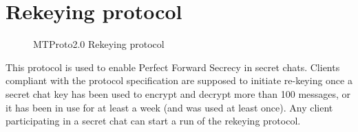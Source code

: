 \section{Rekeying protocol}
\label{sec:rekeying}

\begin{figure}[t]
\setlength{\instdist}{3.5cm}
\setmscoptions
\begin{msc}{}



\nextlevel[2]

\nextlevel[6]
\nextlevel
{}
\nextlevel


\nextlevel[6]
\nextlevel
{}
\nextlevel


\nextlevel[4]
\nextlevel
{}

\end{msc}

\centering
\caption{MTProto2.0 Rekeying protocol}
\label{fig:rekeying-protocol}
\end{figure}

This protocol is used to enable Perfect Forward Secrecy in secret chats. Clients compliant with the protocol specification are supposed to initiate re-keying once a secret chat key has been used to encrypt and decrypt more than 100 messages, or it has been in use for at least a week (and was used at least once). Any client participating in a secret chat can start a run of the rekeying protocol.


